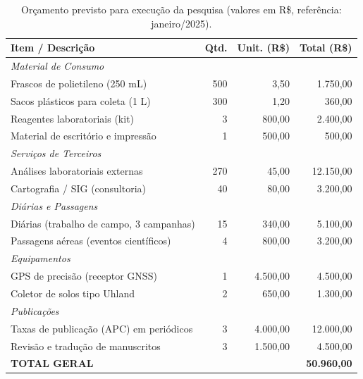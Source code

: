 \begin{table}[H]
  \centering
  \caption{Orçamento previsto para execução da pesquisa
           (valores em R\$, referência: janeiro/2025).}
  \label{tab:orcamento}
  \begin{tabularx}{\textwidth}{Xrrr}
    \toprule
    \textbf{Item / Descrição}
      & \textbf{Qtd.}
      & \textbf{Unit. (R\$)}
      & \textbf{Total (R\$)} \\
    \midrule
    \multicolumn{4}{l}{\textit{Material de Consumo}} \\
    \thinrule
    \quad Frascos de polietileno (250 mL)      & 500 & 3,50   & 1.750,00 \\
    \thinrule
    \quad Sacos plásticos para coleta (1 L)    & 300 & 1,20   & 360,00   \\
    \thinrule
    \quad Reagentes laboratoriais (kit)        &   3 & 800,00 & 2.400,00 \\
    \thinrule
    \quad Material de escritório e impressão   &   1 & 500,00 & 500,00   \\
    \midrule
    \multicolumn{4}{l}{\textit{Serviços de Terceiros}} \\
    \thinrule
    \quad Análises laboratoriais externas      & 270 & 45,00  & 12.150,00 \\
    \thinrule
    \quad Cartografia / SIG (consultoria)      &  40 & 80,00  & 3.200,00 \\
    \midrule
    \multicolumn{4}{l}{\textit{Diárias e Passagens}} \\
    \thinrule
    \quad Diárias (trabalho de campo, 3 campanhas) & 15 & 340,00 & 5.100,00 \\
    \thinrule
    \quad Passagens aéreas (eventos científicos)   &  4 & 800,00 & 3.200,00 \\
    \midrule
    \multicolumn{4}{l}{\textit{Equipamentos}} \\
    \thinrule
    \quad GPS de precisão (receptor GNSS)      &   1 & 4.500,00 & 4.500,00 \\
    \thinrule
    \quad Coletor de solos tipo Uhland         &   2 & 650,00   & 1.300,00 \\
    \midrule
    \multicolumn{4}{l}{\textit{Publicações}} \\
    \thinrule
    \quad Taxas de publicação (APC) em periódicos  &  3 & 4.000,00 & 12.000,00 \\
    \thinrule
    \quad Revisão e tradução de manuscritos        &  3 & 1.500,00 &  4.500,00 \\
    \midrule
    \textbf{TOTAL GERAL}                       & & & \textbf{50.960,00} \\
    \bottomrule
  \end{tabularx}
\end{table}

